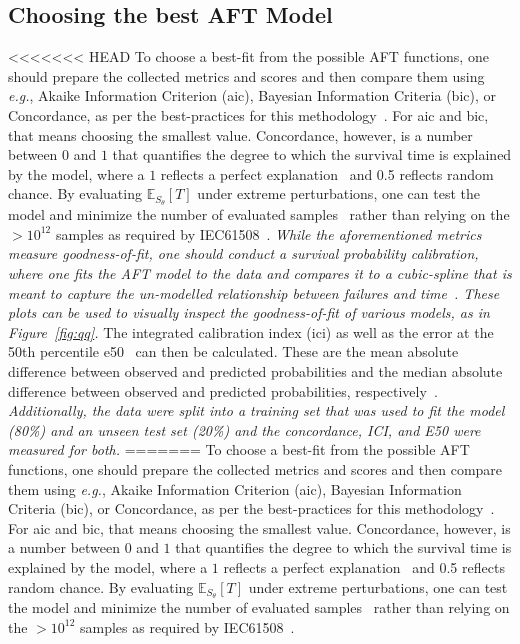 \documentclass[sn-mathphys-num]{sn-jnl}%
\newcommand{\cm}[1]{\textit{{\color{blue}#1}}}
\begin{document}
\subsection{Choosing the best AFT Model}
\label{best-fit}
<<<<<<< HEAD
To choose a best-fit from the possible AFT functions, one should prepare the collected metrics and scores and then compare them using \textit{e.g.}, Akaike Information Criterion (\acrshort{aic}), Bayesian Information Criteria (\acrshort{bic}), or Concordance, as per the best-practices for this methodology~\cite{aft_models,kleinbaum1996survival}.
For \acrshort{aic} and \acrshort{bic}, that means choosing the smallest value. Concordance, however, is a number between $0$ and $1$ that quantifies the degree to which the survival time is explained by the model, where a $1$ reflects a perfect explanation~\cite{kleinbaum1996survival} and 0.5 reflects random chance. By evaluating $\mathbb{E}_{S_\theta}[T]$ under extreme perturbations, one can test the model and minimize the number of evaluated samples~\cite{aft_models,kleinbaum1996survival} rather than relying on the $> 10^{12}$ samples as required by IEC61508~\cite{IEC61508}.
\cm{
While the aforementioned metrics measure goodness-of-fit, one should conduct a \textit{survival probability calibration}, where one fits the AFT model to the data and compares it to a cubic-spline that is meant to capture the un-modelled relationship between failures and time~\cite{ici}. These plots can be used to visually inspect the goodness-of-fit of various models, as in Figure~\ref{fig:qq}.
}
The integrated calibration index (\acrshort{ici}) as well as the error at the 50th percentile \acrshort{e50}~\cite{ici} can then be calculated.
These are the mean absolute difference between observed and predicted probabilities and the median absolute difference between observed and predicted probabilities, respectively~\cite{ici}.
\cm{Additionally, the data were split into a training set that was used to fit the model (80\%) and an unseen test set (20\%) and the concordance, ICI, and E50 were measured for both.}
=======
To choose a best-fit from the possible AFT functions, one should prepare the collected metrics and scores and then compare them using \textit{e.g.}, Akaike Information Criterion (\acrshort{aic}), Bayesian Information Criteria (\acrshort{bic}), or Concordance, as per the best-practices for this methodology~\cite{aft_models,kleinbaum1996survival}. 
For \acrshort{aic} and \acrshort{bic}, that means choosing the smallest value. Concordance, however, is a number between $0$ and $1$ that quantifies the degree to which the survival time is explained by the model, where a $1$ reflects a perfect explanation~\cite{kleinbaum1996survival} and 0.5 reflects random chance. By evaluating $\mathbb{E}_{S_\theta}[T]$ under extreme perturbations, one can test the model and minimize the number of evaluated samples~\cite{aft_models,kleinbaum1996survival} rather than relying on the $> 10^{12}$ samples as required by IEC61508~\cite{IEC61508}. 
\end{document}
